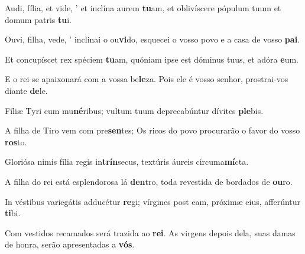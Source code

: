 \begin{greenumerate}
  \switchcolumn*


  \item Audi, fília, et vide, {\large'} et inclína aurem \textbf{tu}am, {\GreStar} et oblivíscere pópulum tuum et domum patris \textbf{tu}i. 

  \switchcolumn%

  \item Ouvi, filha, vede, {\large'} inclinai o ou\textbf{vi}do, {\GreStar} esquecei o vosso povo e a casa de vosso \textbf{pai}. 

  \switchcolumn*


  \item Et concupíscet rex spéciem \textbf{tu}am, {\GreStar} quóniam ipse est dóminus tuus, et adóra \textbf{e}um. 

  \switchcolumn%

  \item E o rei se apaixonará com a vossa be\textbf{le}za. {\GreStar} Pois ele é vosso senhor, prostrai-vos diante \textbf{de}le. 

  \switchcolumn*


  \item Fíliæ Tyri cum mu\textbf{né}ribus; {\GreStar} vultum tuum deprecabúntur dívites \textbf{ple}bis. 

  \switchcolumn%

  \item A filha de Tiro vem com pre\textbf{sen}tes; {\GreStar} Os ricos do povo procurarão o favor do vosso \textbf{ros}to. 

  \switchcolumn*


  \item Gloriósa nimis fília regis in\textbf{trín}secus, {\GreStar} textúris áureis circuma\textbf{mí}cta. 

  \switchcolumn%

  \item A filha do rei está esplendorosa lá \textbf{den}tro, {\GreStar} toda revestida de bordados de \textbf{ou}ro. 

  \switchcolumn*


  \item In véstibus variegátis adducétur \textbf{re}gi; {\GreStar} vírgines post eam, próximæ eius, afferúntur \textbf{ti}bi. 

  \switchcolumn%

  \item Com vestidos recamados será trazida ao \textbf{rei}. {\GreStar} As virgens depois dela, suas damas de honra, serão apresentadas a \textbf{vós}. 
\end{greenumerate}